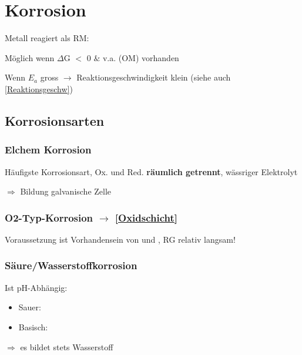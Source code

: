 \section{Korrosion}
    Metall reagiert als RM: 
    
    Möglich wenn $\Delta$G $<$ 0 $\&$ v.a.  (OM) vorhanden

    Wenn $E_a$ gross $\to$ Reaktionsgeschwindigkeit klein (siehe auch \ref{Reaktionsgeschw})

\subsection{Korrosionsarten}
    \subsubsection{Elchem Korrosion}
        Häufigste Korrosionsart, Ox. und Red. \textbf{räumlich getrennt}, wässriger Elektrolyt

        $\Rightarrow$ Bildung galvanische Zelle
    \subsubsection{O2-Typ-Korrosion $\to$ \ref{Oxidschicht}}


        Voraussetzung ist Vorhandensein von  und , RG relativ langsam!
    \subsubsection{Säure/Wasserstoffkorrosion}
        Ist pH-Abhängig:

        \begin{minipage}{0.55\linewidth}
            \begin{itemize}
                \item Sauer: 
                \item Basisch: 
            \end{itemize}
        \end{minipage}
        \hfill
        \begin{minipage}{0.45\linewidth}
            $\Rightarrow$ es bildet stets Wasserstoff 
        \end{minipage}
        
